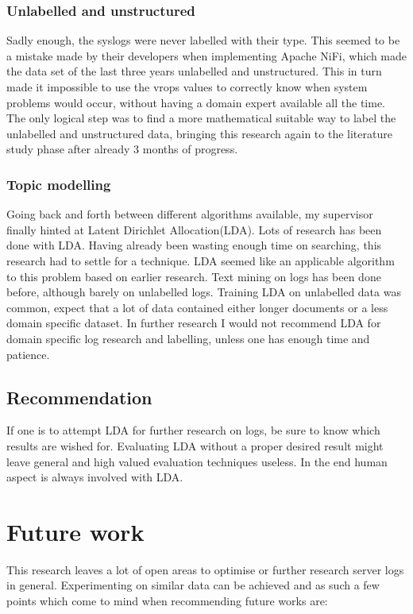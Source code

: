 \subsubsection{Unlabelled and unstructured}
Sadly enough, the syslogs were never labelled with their type. This seemed to be a mistake made by their developers when implementing Apache NiFi, which made the data set of the last three years unlabelled and unstructured. This in turn made it impossible to use the vrops values to correctly know when system problems would occur, without having a domain expert available all the time. The only logical step was to find a more mathematical suitable way to label the unlabelled and unstructured data, bringing this research again to the literature study phase after already 3 months of progress.

\subsubsection{Topic modelling}
Going back and forth between different algorithms available, my supervisor finally hinted at Latent Dirichlet Allocation(LDA). Lots of research has been done with LDA. Having already been wasting enough time on searching, this research had to settle for a technique. LDA seemed like an applicable algorithm to this problem based on earlier research. Text mining on logs has been done before, although barely on unlabelled logs. Training LDA on unlabelled data was common, expect that a lot of data contained either longer documents or a less domain specific dataset. In further research I would not recommend LDA for domain specific log research and labelling, unless one has enough time and patience. 

\subsection{Recommendation}
If one is to attempt LDA for further research on logs, be sure to know which results are wished for. Evaluating LDA without a proper desired result might leave general and high valued evaluation techniques useless. In the end human aspect is always involved with LDA.

\section{Future work}
This research leaves a lot of open areas to optimise or further research server logs in general. Experimenting on similar data can be achieved and as such a few points which come to mind when recommending future works are:

